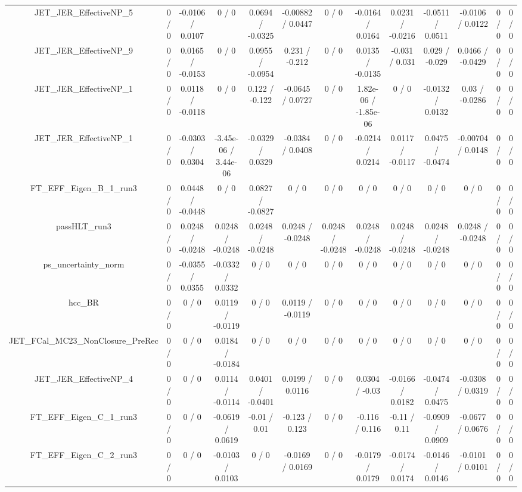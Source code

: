 \documentclass[10pt]{article}
\begin{document}
\begin{table}[htbp]
\begin{center}
\begin{tabular}{|c|c|c|c|c|c|c|c|c|c|c|c|c|}
  JET_JER_EffectiveNP_5 & 0 / 0 & -0.0106 / 0.0107 & 0 / 0 & 0.0694 / -0.0325 & -0.00882 / 0.0447 & 0 / 0 & -0.0164 / 0.0164 & 0.0231 / -0.0216 & -0.0511 / 0.0511 & -0.0106 / 0.0122 & 0 / 0 & 0 / 0 \\ 
  JET_JER_EffectiveNP_9 & 0 / 0 & 0.0165 / -0.0153 & 0 / 0 & 0.0955 / -0.0954 & 0.231 / -0.212 & 0 / 0 & 0.0135 / -0.0135 & -0.031 / 0.031 & 0.029 / -0.029 & 0.0466 / -0.0429 & 0 / 0 & 0 / 0 \\ 
  JET_JER_EffectiveNP_1 & 0 / 0 & 0.0118 / -0.0118 & 0 / 0 & 0.122 / -0.122 & -0.0645 / 0.0727 & 0 / 0 & 1.82e-06 / -1.85e-06 & 0 / 0 & -0.0132 / 0.0132 & 0.03 / -0.0286 & 0 / 0 & 0 / 0 \\ 
  JET_JER_EffectiveNP_1 & 0 / 0 & -0.0303 / 0.0304 & -3.45e-06 / 3.44e-06 & -0.0329 / 0.0329 & -0.0384 / 0.0408 & 0 / 0 & -0.0214 / 0.0214 & 0.0117 / -0.0117 & 0.0475 / -0.0474 & -0.00704 / 0.0148 & 0 / 0 & 0 / 0 \\ 
  FT_EFF_Eigen_B_1_run3 & 0 / 0 & 0.0448 / -0.0448 & 0 / 0 & 0.0827 / -0.0827 & 0 / 0 & 0 / 0 & 0 / 0 & 0 / 0 & 0 / 0 & 0 / 0 & 0 / 0 & 0 / 0 \\ 
  passHLT_run3 & 0 / 0 & 0.0248 / -0.0248 & 0.0248 / -0.0248 & 0.0248 / -0.0248 & 0.0248 / -0.0248 & 0.0248 / -0.0248 & 0.0248 / -0.0248 & 0.0248 / -0.0248 & 0.0248 / -0.0248 & 0.0248 / -0.0248 & 0 / 0 & 0 / 0 \\ 
  ps_uncertainty_norm & 0 / 0 & -0.0355 / 0.0355 & -0.0332 / 0.0332 & 0 / 0 & 0 / 0 & 0 / 0 & 0 / 0 & 0 / 0 & 0 / 0 & 0 / 0 & 0 / 0 & 0 / 0 \\ 
  hcc_BR & 0 / 0 & 0 / 0 & 0.0119 / -0.0119 & 0 / 0 & 0.0119 / -0.0119 & 0 / 0 & 0 / 0 & 0 / 0 & 0 / 0 & 0 / 0 & 0 / 0 & 0 / 0 \\ 
  JET_FCal_MC23_NonClosure_PreRec & 0 / 0 & 0 / 0 & 0.0184 / -0.0184 & 0 / 0 & 0 / 0 & 0 / 0 & 0 / 0 & 0 / 0 & 0 / 0 & 0 / 0 & 0 / 0 & 0 / 0 \\ 
  JET_JER_EffectiveNP_4 & 0 / 0 & 0 / 0 & 0.0114 / -0.0114 & 0.0401 / -0.0401 & 0.0199 / 0.0116 & 0 / 0 & 0.0304 / -0.03 & -0.0166 / 0.0182 & -0.0474 / 0.0475 & -0.0308 / 0.0319 & 0 / 0 & 0 / 0 \\ 
  FT_EFF_Eigen_C_1_run3 & 0 / 0 & 0 / 0 & -0.0619 / 0.0619 & -0.01 / 0.01 & -0.123 / 0.123 & 0 / 0 & -0.116 / 0.116 & -0.11 / 0.11 & -0.0909 / 0.0909 & -0.0677 / 0.0676 & 0 / 0 & 0 / 0 \\ 
  FT_EFF_Eigen_C_2_run3 & 0 / 0 & 0 / 0 & -0.0103 / 0.0103 & 0 / 0 & -0.0169 / 0.0169 & 0 / 0 & -0.0179 / 0.0179 & -0.0174 / 0.0174 & -0.0146 / 0.0146 & -0.0101 / 0.0101 & 0 / 0 & 0 / 0 \\ 

\end{tabular}
\end{center}
\end{table}
\end{document}

